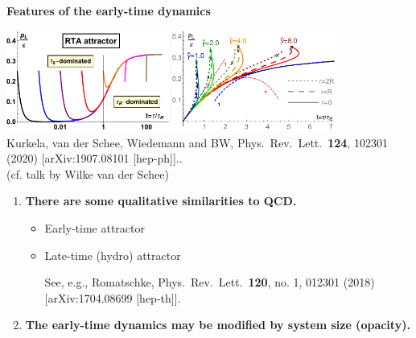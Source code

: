 \documentclass[9pt,a4paper,unknownkeysallowed,xcolor=dvipsnames,aspectratio=43]{beamer}
\begin{document}
%
%
\begin{frame}{\bf\huge Features of the early-time dynamics}
\vspace{2mm}
\begin{center}
\includegraphics[width=0.4\textwidth]{fig/RTAattract}
\includegraphics[width=0.4\textwidth]{fig/rcurve}\\
\vspace{2mm}
{\tiny  {\color{teablue}   Kurkela, van der Schee, Wiedemann and BW,
  Phys.\ Rev.\ Lett.\  {\bf 124}, 102301 (2020)
  [arXiv:1907.08101 [hep-ph]]..
  }}\\
  \vspace{2mm}
  {\color{teablue} (cf. talk by Wilke van der Schee)}
\end{center}
\begin{enumerate}
\item{\large\bf There are some qualitative similarities to QCD.}\\
\vspace{2mm}
\begin{itemize}
\item{\large Early-time attractor}\vspace{1mm}
\item{\large Late-time (hydro) attractor}
\begin{center}
{\tiny  See, e.g., {\color{teablue}  
    Romatschke,
  Phys.\ Rev.\ Lett.\  {\bf 120}, no. 1, 012301 (2018)
  [arXiv:1704.08699 [hep-th]].
  }}
\end{center}
\end{itemize}
\vspace{1mm}
\item{\bf The early-time dynamics may be modified by system size (opacity).}
\end{enumerate}
\end{frame}
\end{document}
